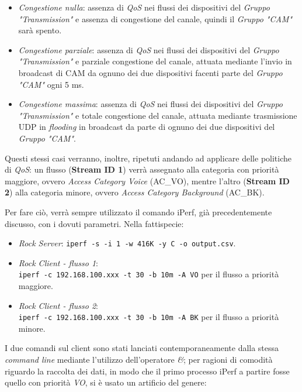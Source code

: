 \begin{itemize}
    \item \textit{Congestione nulla}: assenza di \textit{QoS} nei flussi dei dispositivi del \textit{Gruppo "Transmission"} e assenza di congestione del canale, quindi il \textit{Gruppo "CAM"} sarà spento.
    \item \textit{Congestione parziale}: assenza di \textit{QoS} nei flussi dei dispositivi del \textit{Gruppo "Transmission"} e parziale congestione del canale, attuata mediante l'invio in broadcast di CAM da ognuno dei due dispositivi facenti parte del \textit{Gruppo "CAM"} ogni 5 ms.
    \item \textit{Congestione massima}: assenza di \textit{QoS} nei flussi dei dispositivi del \textit{Gruppo "Transmission"} e totale congestione del canale, attuata mediante trasmissione UDP in \textit{flooding} in broadcast da parte di ognuno dei due dispositivi del \textit{Gruppo "CAM"}.
\end{itemize}

Questi stessi casi verranno, inoltre, ripetuti andando ad applicare delle politiche di \textit{QoS}: un flusso (\textbf{Stream ID 1}) verrà assegnato alla categoria con priorità maggiore, ovvero \textit{Access Category Voice} (AC\_VO), mentre l'altro (\textbf{Stream ID 2}) alla categoria minore, ovvero \textit{Access Category Background} (AC\_BK).

Per fare ciò, verrà sempre utilizzato il comando iPerf, già precedentemente discusso, con i dovuti parametri. Nella fattispecie:

\begin{itemize}
    \item \textit{Rock Server}: \verb|iperf -s -i 1 -w 416K -y C -o output.csv|.
    \item \textit{Rock Client - flusso 1}: \\\verb|iperf -c 192.168.100.xxx -t 30 -b 10m -A VO| per il flusso a priorità maggiore.
    \item \textit{Rock Client - flusso 2}: \\\verb|iperf -c 192.168.100.xxx -t 30 -b 10m -A BK| per il flusso a priorità minore.
\end{itemize}

I due comandi sul client sono stati lanciati contemporaneamente dalla stessa \textit{command line} mediante l'utilizzo dell'operatore \textit{\&}; per ragioni di comodità riguardo la raccolta dei dati, in modo che il primo processo iPerf a partire fosse quello con priorità \textit{VO}, si è usato un artificio del genere:

